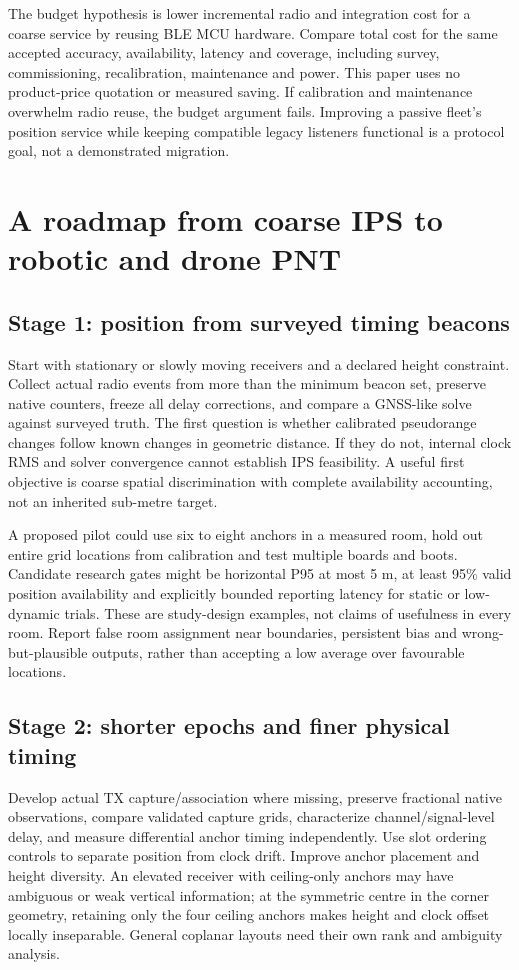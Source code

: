 \documentclass[11pt,letterpaper]{article}
\begin{document}
The budget hypothesis is lower incremental radio and integration cost for a coarse service by reusing BLE MCU hardware. Compare total cost for the same accepted accuracy, availability, latency and coverage, including survey, commissioning, recalibration, maintenance and power. This paper uses no product-price quotation or measured saving. If calibration and maintenance overwhelm radio reuse, the budget argument fails. Improving a passive fleet's position service while keeping compatible legacy listeners functional is a protocol goal, not a demonstrated migration.

\section{A roadmap from coarse IPS to robotic and drone PNT}\label{sec:roadmap}
\subsection{Stage 1: position from surveyed timing beacons}
Start with stationary or slowly moving receivers and a declared height constraint. Collect actual radio events from more than the minimum beacon set, preserve native counters, freeze all delay corrections, and compare a GNSS-like solve against surveyed truth. The first question is whether calibrated pseudorange changes follow known changes in geometric distance. If they do not, internal clock RMS and solver convergence cannot establish IPS feasibility. A useful first objective is coarse spatial discrimination with complete availability accounting, not an inherited sub-metre target.

A proposed pilot could use six to eight anchors in a measured room, hold out entire grid locations from calibration and test multiple boards and boots. Candidate research gates might be horizontal P95 at most 5 m, at least 95\% valid position availability and explicitly bounded reporting latency for static or low-dynamic trials. These are study-design examples, not claims of usefulness in every room. Report false room assignment near boundaries, persistent bias and wrong-but-plausible outputs, rather than accepting a low average over favourable locations.

\subsection{Stage 2: shorter epochs and finer physical timing}
Develop actual TX capture/association where missing, preserve fractional native observations, compare validated capture grids, characterize channel/signal-level delay, and measure differential anchor timing independently. Use slot ordering controls to separate position from clock drift. Improve anchor placement and height diversity. An elevated receiver with ceiling-only anchors may have ambiguous or weak vertical information; at the symmetric centre in the corner geometry, retaining only the four ceiling anchors makes height and clock offset locally inseparable. General coplanar layouts need their own rank and ambiguity analysis.
\end{document}
